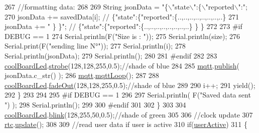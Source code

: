 \begin{DoxyCode}
267             \textcolor{comment}{//formatting data:}
268         
269             String jsonData = \textcolor{stringliteral}{"\{\(\backslash\)"state\(\backslash\)":\{\(\backslash\)"reported\(\backslash\)":"};
270             jsonData += savedData[i]; \textcolor{comment}{// \{"state":\{"reported":\{..,..,..,..,..,..,..,..\}}
271             jsonData += \textcolor{stringliteral}{" \} \}"}; \textcolor{comment}{// \{"state":\{"reported":\{..,..,..,..,..,..,..,..\}  \} \}}
272 
273 \textcolor{preprocessor}{        #if DEBUG == 1 }
274             Serial.println(F(\textcolor{stringliteral}{"Size is : "}));
275             Serial.println(size);
276             Serial.print(F(\textcolor{stringliteral}{"sending line N°"}));
277             Serial.println(i);
278             Serial.println(jsonData);
279             Serial.println();
280 
281 \textcolor{preprocessor}{        #endif}
282 
283             \hyperlink{classCoolBoard_a1b1d3c684a5baa56b08486e192fd8e97}{coolBoardLed}.\hyperlink{classCoolBoardLed_ad5f0de4c628cbfbf49896042831c64ad}{strobe}(128,128,255,0.5);\textcolor{comment}{//shade of blue}
284         
285             \hyperlink{classCoolBoard_a2399f44d7c23c1149a335cb3b46d90f1}{mqtt}.\hyperlink{classCoolMQTT_ace977b3e90ab14b1199fe5c4fb0a13ec}{publish}( jsonData.c\_str() );
286             \hyperlink{classCoolBoard_a2399f44d7c23c1149a335cb3b46d90f1}{mqtt}.\hyperlink{classCoolMQTT_aa5eaae967b562b62cbcf2b8d81f6e5d5}{mqttLoop}();
287         
288             \hyperlink{classCoolBoard_a1b1d3c684a5baa56b08486e192fd8e97}{coolBoardLed}.\hyperlink{classCoolBoardLed_a93d545679237e8cc858324367149775c}{fadeOut}(128,128,255,0.5);\textcolor{comment}{//shade of blue}
289             
290             i++;
291             yield();
292         \}       
293 
294 
295 \textcolor{preprocessor}{    #if DEBUG == 1}
296 
297         Serial.println( F(\textcolor{stringliteral}{"Saved data sent "}) );
298         Serial.println();
299     
300 \textcolor{preprocessor}{    #endif}
301 
302     \}
303 
304     \hyperlink{classCoolBoard_a1b1d3c684a5baa56b08486e192fd8e97}{coolBoardLed}.\hyperlink{classCoolBoardLed_a96e1ea13003eee34c9dbcef340404426}{blink}(128,255,50,0.5);\textcolor{comment}{//shade of green}
305 
306     \textcolor{comment}{//clock update}
307     \hyperlink{classCoolBoard_a50d2a6716879d64a85f3c6b44ad63275}{rtc}.\hyperlink{classCoolTime_aae601f795452cfa48d9fb337aed483a8}{update}();
308 
309     \textcolor{comment}{//read user data if user is active}
310     \textcolor{keywordflow}{if}(\hyperlink{classCoolBoard_a6395459131d6889a3005f79c7a35e964}{userActive})
311     \{

\end{DoxyCode}
